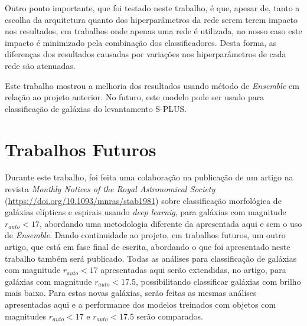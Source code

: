 Outro ponto importante, que foi testado neste trabalho, é que, apesar de, tanto a escolha da arquitetura quanto dos hiperparâmetros da rede serem terem impacto nos resultados, em trabalhos onde apenas uma rede é utilizada, no nosso caso este impacto é minimizado pela combinação dos classificadores. Desta forma, as diferenças dos resultados causadas por variações nos hiperparâmetros de cada rede são atenuadas.

Este trabalho mostrou a melhoria dos resultados usando método de \emph{Ensemble} em relação ao projeto anterior. No futuro, este modelo pode ser usado para classificação de galáxias do levantamento S-PLUS.


\section{Trabalhos Futuros}

Durante este trabalho, foi feita uma colaboração na publicação de um artigo na revista \emph{Monthly Notices of the Royal Astronomical Society} (\url{https://doi.org/10.1093/mnras/stab1981}) sobre classificação morfológica de galáxias elípticas e espirais usando \emph{deep learnig}, para galáxias com magnitude $r_{auto} < 17$, abordando uma metodologia diferente da apresentada aqui e sem o uso de \emph{Ensemble}. Dando continuidade ao projeto, em trabalhos futuros, um outro artigo, que está em fase final de escrita, abordando o que foi apresentado neste trabalho também será publicado. Todas as análises para classificação de galáxias com magnitude $r_{auto} < 17$ apresentadas aqui serão extendidas, no artigo, para galáxias com magnitude $r_{auto} < 17.5$, possibilitando classificar galáxias com brilho mais baixo. Para estas novas galáxias, serão feitas as mesmas análises apresentadas aqui e a performance dos modelos treinados com objetos com magnitudes $r_{auto} < 17$ e $r_{auto} < 17.5$ serão comparados.